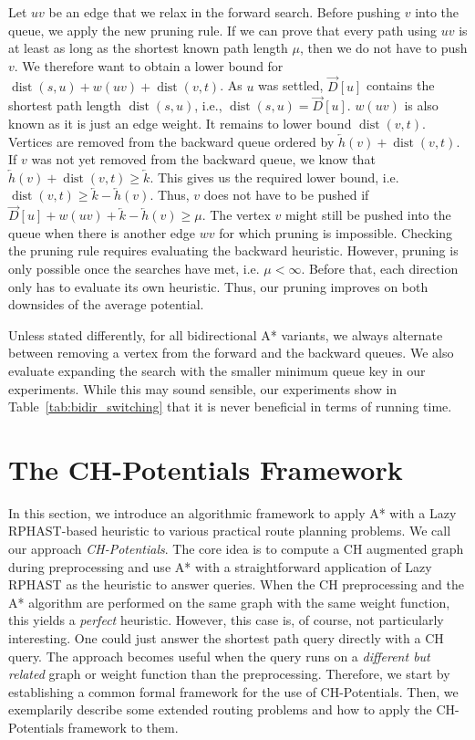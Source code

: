 \documentclass[manuscript,review]{acmart}
\newcommand*{\dist}{\operatorname{dist}}
\begin{document}
Let $uv$ be an edge that we relax in the forward search.
Before pushing $v$ into the queue, we apply the new pruning rule.
If we can prove that every path using $uv$ is at least as long as the shortest known path length $\mu$, then we do not have to push $v$.
We therefore want to obtain a lower bound for $\dist(s,u)+w(uv)+\dist(v,t)$.
As $u$ was settled, $\overrightarrow{D}[u]$ contains the shortest path length $\dist(s,u)$, i.e., $\dist(s,u)=\overrightarrow{D}[u]$.
$w(uv)$ is also known as it is just an edge weight.
It remains to lower bound $\dist(v,t)$.
Vertices are removed from the backward queue ordered by $\overleftarrow{h}(v) + \dist(v,t)$.
If $v$ was not yet removed from the backward queue, we know that $\overleftarrow{h}(v) + \dist(v,t) \geq \overleftarrow{k}$.
This gives us the required lower bound, i.e. $\dist(v,t) \geq \overleftarrow{k}-\overleftarrow{h}(v)$.
Thus, $v$ does not have to be pushed if $\overrightarrow{D}[u]+w(uv)+\overleftarrow{k}-\overleftarrow{h}(v)\ge \mu$.
The vertex $v$ might still be pushed into the queue when there is another edge $wv$ for which pruning is impossible.
Checking the pruning rule requires evaluating the backward heuristic.
However, pruning is only possible once the searches have met, i.e. $\mu < \infty$.
Before that, each direction only has to evaluate its own heuristic.
Thus, our pruning improves on both downsides of the average potential.

Unless stated differently, for all bidirectional A* variants, we always alternate between removing a vertex from the forward and the backward queues.
We also evaluate expanding the search with the smaller minimum queue key in our experiments.
While this may sound sensible, our experiments show in Table~\ref{tab:bidir_switching} that it is never beneficial in terms of running time.

\section{The CH-Potentials Framework}\label{sec:framework}

In this section, we introduce an algorithmic framework to apply A* with a Lazy RPHAST-based heuristic to various practical route planning problems.
We call our approach \emph{CH-Potentials}.
The core idea is to compute a CH augmented graph during preprocessing and use A* with a straightforward application of Lazy RPHAST as the heuristic to answer queries.
When the CH preprocessing and the A* algorithm are performed on the same graph with the same weight function, this yields a \emph{perfect} heuristic.
However, this case is, of course, not particularly interesting.
One could just answer the shortest path query directly with a CH query.
The approach becomes useful when the query runs on a \emph{different but related} graph or weight function than the preprocessing.
Therefore, we start by establishing a common formal framework for the use of CH-Potentials.
Then, we exemplarily describe some extended routing problems and how to apply the CH-Potentials framework to them.
\end{document}
